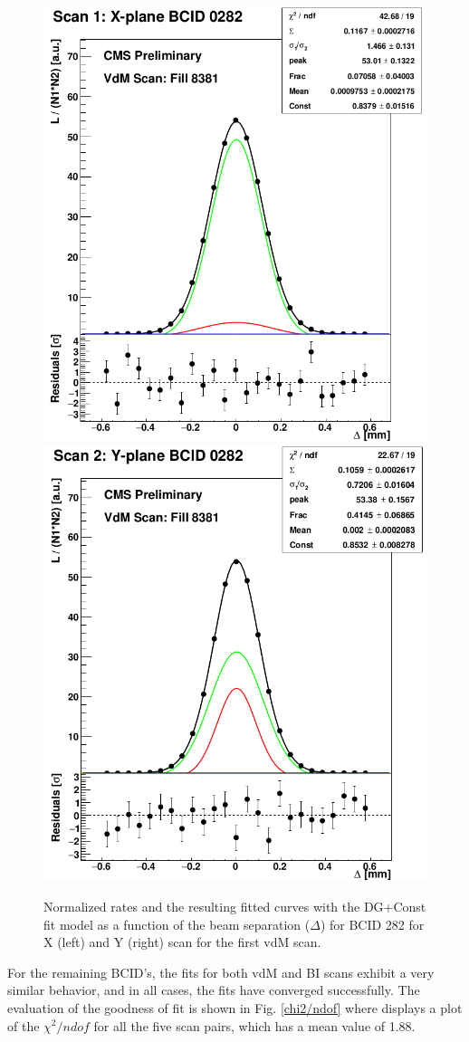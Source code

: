 \begin{center}
\begin{figure}[h!]
\centering
\includegraphics[width=.40\textwidth]{Chapter4/xscan.png}
\includegraphics[width=.40\textwidth]{Chapter4/yscan.png}\\
\caption[vdM1 BCID 282]{Normalized rates and the resulting fitted curves with the DG+Const fit model as a function of the beam separation ($\Delta$) for BCID 282 for X (left) and Y (right) scan for the first vdM scan.}
\label{vdM1_282_XYscan}
\end{figure}
\end{center}
For the remaining BCID's, the fits for both vdM and BI scans exhibit a very similar behavior, and in all cases, the fits have converged successfully. The evaluation of the goodness of fit is shown in Fig. \ref{chi2/ndof} where displays a plot of the $\chi^{2}/ndof$ for all the five scan pairs, which has a mean value of 1.88.

